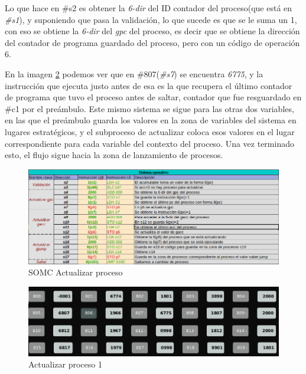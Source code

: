 \documentclass[letterpaper,12pt,oneside]{book}
\begin{document}
        Lo que hace en \#s2 es obtener
		la \textit{6-dir} del ID contador del proceso(que está en \textit{\#s1}), y suponiendo que pasa la validación, lo que sucede es que se le suma un 1, con eso
		se obtiene la \textit{6-dir} del \textit{gpc} del proceso, es decir que se obtiene la dirección del contador de programa guardado del proceso,
		pero con un código de operación 6.
  
        En la imagen \ref{fig:Proceso1ActualizarP1} podemos ver que en \#807(\textit{\#s7}) se encuentra \textit{6775}, y
		la instrucción que ejecuta justo antes de esa es la que recupera el último contador de programa que tuvo el proceso antes de saltar, contador que
		fue resguardado en \#c1 por el preámbulo. Este mismo sistema se sigue para las otras dos variables, en las que el preámbulo guarda los valores
		en la zona de variables del sistema en lugares estratégicos, y el subproceso de actualizar  coloca esos valores en el lugar correspondiente
		para cada variable del contexto del proceso. Una vez terminado esto, el flujo sigue hacia la zona de lanzamiento de procesos.
		
		
		\begin{figure}[ht]		
			\centering
			\includegraphics[scale=0.55]{media/CARDIACC/SO_ActualizarProceso.png}
			\caption{ SOMC Actualizar proceso }
			\label{fig:somcActualizarProceso1}
		\end{figure}		
		
		
		\begin{figure}[ht]		
			\centering
			\includegraphics[scale=0.45]{media/CARDIACC/Proceso1ActualizarP1.png}
			\caption{ Actualizar proceso 1}
			\label{fig:Proceso1ActualizarP1}
		\end{figure}		
		
\end{document}
